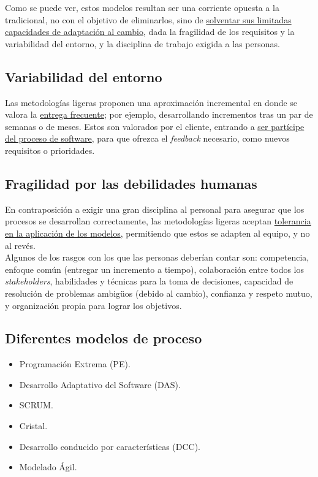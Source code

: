 Como se puede ver, estos modelos resultan ser una corriente opuesta a la tradicional, no con el objetivo de eliminarlos, sino de \uline{solventar sus limitadas capacidades de adaptación al cambio}, dada la fragilidad de los requisitos y la variabilidad del entorno, y la disciplina de trabajo exigida a las personas.\\

\subsection{Variabilidad del entorno}

Las metodologías ligeras proponen una aproximación incremental en donde se valora la \uline{entrega frecuente}; por ejemplo, desarrollando incrementos tras un par de semanas o de meses. Estos son valorados por el cliente, entrando a \uline{ser partícipe del proceso de software}, para que ofrezca el \textit{feedback} necesario, como nuevos requisitos o prioridades.

\subsection{Fragilidad por las debilidades humanas}

En contraposición a exigir una gran disciplina al personal para asegurar que los procesos se desarrollan correctamente, las metodologías ligeras aceptan \uline{tolerancia en la aplicación de los modelos}, permitiendo que estos se adapten al equipo, y no al revés.\\

Algunos de los rasgos con los que las personas deberían contar son: competencia, enfoque común (entregar un incremento a tiempo), colaboración entre todos los \textit{stakeholders}, habilidades y técnicas para la toma de decisiones, capacidad de resolución de problemas ambigüos (debido al cambio), confianza y respeto mutuo, y organización propia para lograr los objetivos.

\subsection{Diferentes modelos de proceso}

\begin{itemize}
   \item Programación Extrema (PE).
   \item Desarrollo Adaptativo del Software (DAS).
   \item SCRUM.
   \item Cristal.
   \item Desarrollo conducido por características (DCC).
   \item Modelado Ágil.
\end{itemize}

